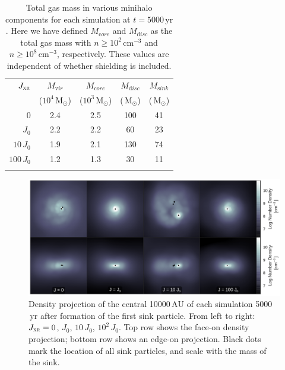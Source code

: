 \documentclass{thesis}
\newcommand{\cc}{\ensuremath{\,\mathrm{cm}^{-3}}\xspace}
\newcommand{\msun}{\ensuremath{\,\mathrm{M}_{\odot}}\xspace}
\newcommand{\au}{\ensuremath{\,\mathrm{AU}}\xspace}
\newcommand{\yr}{\ensuremath{\,\mathrm{yr}}\xspace}
\newcommand{\jxr}{\ensuremath{J_{\textsc{xr}}}\xspace}
\begin{document}
 \begin{table}
  \caption{Total gas mass in various minihalo components for each simulation at $t=5000\yr$. Here we have defined $M_{\mathrm core}$ and $M_{\mathrm disc}$ as the total gas mass with $n\geq10^2\cc$ and $n\geq10^8\cc$, respectively. These values are independent of whether shielding is included.}
  \centering
  \begin{tabular}{r c c c c }
    \hline\hline
    \jxr & $M_{\mathrm vir}$ & $M_{\mathrm core}$ & $M_{\mathrm disc}$ & $M_{\mathrm sink}$\\
    & ($10^4\msun$) & ($10^3\msun$) & (\msun) & (\msun) \\
    \hline
    $0$        & 2.4 & 2.5 & 100 & 41 \\
    $J_0$      & 2.2 & 2.2 &  60 & 23 \\
    $10\,J_0$  & 1.9 & 2.1 & 130 & 74 \\
    $100\,J_0$ & 1.2 & 1.3 &  30 & 11 \\
    \hline
    \\
  \end{tabular}
  \label{masstable}
\end{table}

\begin{figure}
  \begin{center}
    \includegraphics[width=\columnwidth]{figures/structure/disks}
    \caption{Density projection of the central 10000\au of each simulation 5000\yr after formation of the first sink particle. From left to right: $\jxr=0$, $J_0$, $10\,J_0$, $10^2\,J_0$.  Top row shows the face-on density projection; bottom row shows an edge-on projection.  Black dots mark the location of all sink particles, and scale with the mass of the sink.}
    \label{disks}
  \end{center}
\end{figure}
\end{document}

